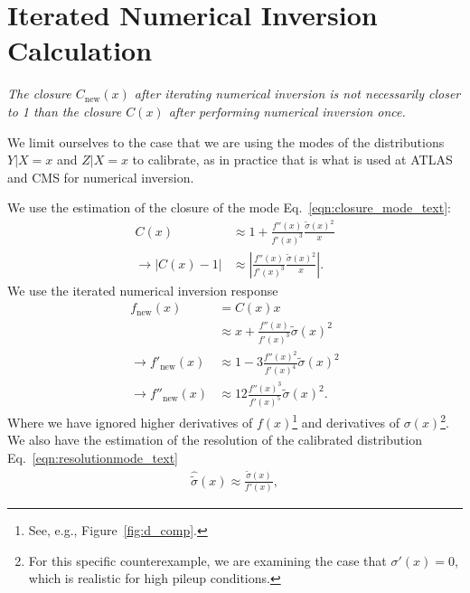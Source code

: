 \section{Iterated Numerical Inversion Calculation}
\label{sec:iterated}
{\it The closure $C_\text{new}(x)$ after iterating numerical inversion is not necessarily closer to 1 than the closure $C(x)$ after performing numerical inversion once.}

\vspace{5mm}

We limit ourselves to the case that we are using the modes of the distributions $Y|X=x$ and $Z|X=x$ to calibrate, as in practice that is what is used at ATLAS and CMS for numerical inversion.

We use the estimation of the closure of the mode Eq.~\ref{eqn:closure_mode_text}:
\begin{align}
C(x) &\approx 1+\frac{f''(x)}{f'(x)^3}\frac{\tilde{\sigma}(x)^2}{x}\nonumber\\
\rightarrow |C(x)-1|&\approx \left|\frac{f''(x)}{f'(x)^3}\frac{\tilde{\sigma}(x)^2}{x}\right|.
\end{align}
We use the iterated numerical inversion response
\begin{align}
f_{\text{new}}(x) &= C(x)x\nonumber\\
&\approx x+\frac{f''(x)}{f'(x)^3}\tilde{\sigma}(x)^2\\
\rightarrow f'_{\text{new}}(x) &\approx 1-3\frac{f''(x)^2}{f'(x)^4}\tilde{\sigma}(x)^2\\
\rightarrow f''_{\text{new}}(x) &\approx 12\frac{f''(x)^3}{f'(x)^5}\tilde{\sigma}(x)^2.
\end{align}
Where we have ignored higher derivatives of $f(x)$\footnote{See, e.g., Figure~\ref{fig:d_comp}.} and derivatives of $\sigma(x)$\footnote{For this specific counterexample, we are examining the case that $\sigma'(x)=0$, which is realistic for high pileup conditions.}.  We also have the estimation of the resolution of the calibrated distribution Eq.~\ref{eqn:resolutionmode_text}
\begin{align}
\hat{\tilde{\sigma}}(x) \approx \frac{\tilde{\sigma}(x)}{f'(x)},
\end{align}

